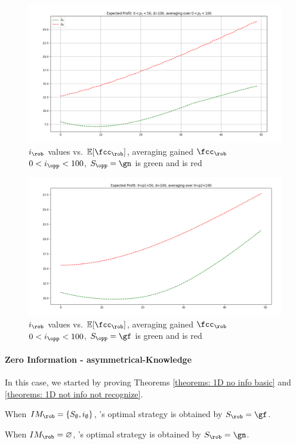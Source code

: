 \documentclass[a4paper,english,10pt]{article}
\begin{document}

\begin{figure}
    \centering
    \includegraphics[width=\textwidth]{Images/E1_E2_p2A_abs.png}
    \caption{$i_\rob$ values vs. $\mathbb{E}[\fcc_\rob]$, averaging gained $\fcc_\rob$  $0<i_\opp<100$, $S_\opp=\gn$ \gn is green and \gf is red}
    \label{figures:1d unkown Io So=GN}
\end{figure}

\begin{figure}
    \centering
    \includegraphics[width=\textwidth]{Images/E1_E2_w_wo_abs.png}
    \caption{$i_\rob$ values vs. $\mathbb{E}[\fcc_\rob]$, averaging gained $\fcc_\rob$  $0<i_\opp<100$, $S_\opp=\gf$ \gn is green and \gf is red}
    \label{figures:1d unkown Io So=GF}
\end{figure}

\paragraph{Zero Information - asymmetrical-Knowledge}
In this case, we started by proving Theorems \ref{theorems: 1D no info basic} and \ref{theorems: 1D not info not recognize}.
\begin{theorem} \label{theorems: 1D no info basic}
When $IM_\rob=\lbrace S_\emptyset, i_\emptyset \rbrace$, \rob's optimal strategy is obtained by $S_\rob = \gf$.
\end{theorem}
\begin{theorem} \label{theorems: 1D not info not recognize}
When $IM_\rob=\varnothing$, \rob's optimal strategy is obtained by $S_\rob = \gn$.
\end{theorem}
\end{document}
